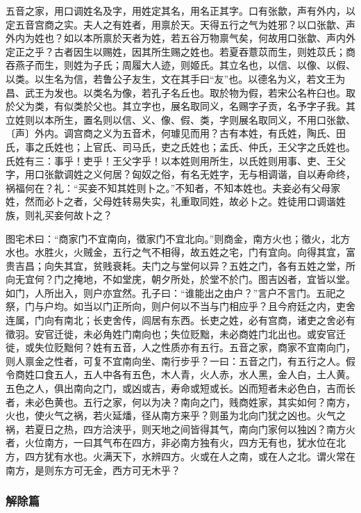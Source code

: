\documentclass[]{article}
\begin{document}
五音之家，用口调姓名及字，用姓定其名，用名正其字。口有张歙，声有外内，以定五音宫商之实。夫人之有姓者，用禀於天。天得五行之气为姓邪？以口张歙、声外内为姓也？如以本所禀於天者为姓，若五谷万物禀气矣，何故用口张歙、声内外定正之乎？古者因生以赐姓，因其所生赐之姓也。若夏吞薏苡而生，则姓苡氏；商吞燕子而生，则姓为子氏；周履大人迹，则姬氏。其立名也，以信、以像、以假、以类。以生名为信，若鲁公子友生，文在其手曰``友''也。以德名为义，若文王为昌、武王为发也。以类名为像，若孔子名丘也。取於物为假，若宋公名杵臼也。取於父为类，有似类於父也。其立字也，展名取同义，名赐字子贡，名予字子我。其立姓则以本所生，置名则以信、义、像、假、类，字则展名取同义，不用口张歙、〔声〕外内。调宫商之义为五音术，何璩见而用？古有本姓，有氏姓，陶氏、田氏，事之氏姓也；上官氏、司马氏，吏之氏姓也；孟氏、仲氏，王父字之氏姓也。氏姓有三：事乎！吏乎！王父字乎！以本姓则用所生，以氏姓则用事、吏、王父字，用口张歙调姓之义何居？匈奴之俗，有名无姓字，无与相调谐，自以寿命终，祸福何在？礼：``买妾不知其姓则卜之。''不知者，不知本姓也。夫妾必有父母家姓，然而必卜之者，父母姓转易失实，礼重取同姓，故必卜之。姓徒用口调谐姓族，则礼买妾何故卜之？

图宅术曰：``商家门不宜南向，徵家门不宜北向。''则商金，南方火也；徵火，北方水也。水胜火，火贼金，五行之气不相得，故五姓之宅，门有宜向。向得其宜，富贵吉昌；向失其宜，贫贱衰耗。夫门之与堂何以异？五姓之门，各有五姓之堂，所向无宜何？门之掩地，不如堂庑，朝夕所处，於堂不於门。图吉凶者，宜皆以堂。如门，人所出入，则户亦宜然。孔子曰：``谁能出之由户？''言户不言门。五祀之祭，门与户均。如当以门正所向，则户何以不当与门相应乎？且今府廷之内，吏舍连属，门向有南北；长吏舍传，闾居有东西。长吏之姓，必有宫商，诸吏之舍必有徵羽。安官迁徙，未必角姓门南向也；失位贬黜，未必商姓门北出也。或安官迁徙，或失位贬黜何？姓有五音，人之性质亦有五行。五音之家，商家不宜南向门，则人禀金之性者，可复不宜南向坐、南行步乎？一曰：五音之门，有五行之人。假令商姓口食五人，五人中各有五色，木人青，火人赤，水人黑，金人白，土人黄。五色之人，俱出南向之门，或凶或吉，寿命或短或长。凶而短者未必色白，吉而长者，未必色黄也。五行之家，何以为决？南向之门，贱商姓家，其实如何？南方，火也，使火气之祸，若火延燔，径从南方来乎？则虽为北向门犹之凶也。火气之祸，若夏日之热，四方洽浃乎，则天地之间皆得其气，南向门家何以独凶？南方火者，火位南方，一曰其气布在四方，非必南方独有火，四方无有也，犹水位在北方，四方犹有水也。火满天下，水辨四方。火或在人之南，或在人之北。谓火常在南方，是则东方可无金，西方可无木乎？

\hypertarget{header-n860}{%
\subsubsection{解除篇}\label{header-n860}}
\end{document}
